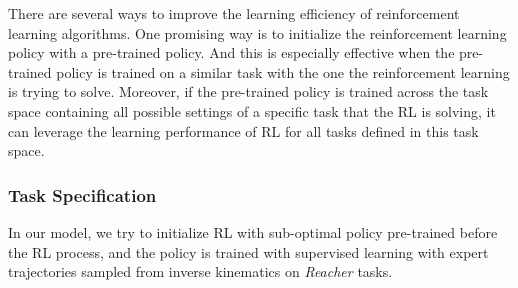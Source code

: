 \documentclass{article}
\begin{document}
There are several ways to improve the learning efficiency of reinforcement learning algorithms. One promising way is to initialize the reinforcement learning policy with a pre-trained policy. And this is especially effective when the pre-trained policy is trained on a similar task with the one the reinforcement learning is trying to solve. Moreover, if the pre-trained policy is trained across the task space containing all possible settings of a specific task that the RL is solving, it can leverage the learning performance of RL for all tasks defined in this task space.
\subsubsection{Task Specification}
In our model, we try to initialize RL with sub-optimal policy pre-trained before the RL process, and the policy is trained with supervised learning with expert trajectories sampled from inverse kinematics on \textit{Reacher} tasks. 
\end{document}

